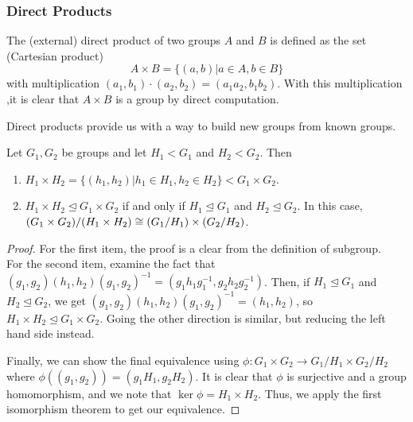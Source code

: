 \documentclass[11pt,leqno,oneside]{amsart}
\newcommand{\subgroup}{\mathrel{<}}
\newcommand{\normsubgroup}{\mathrel{\unlhd}}
\begin{document}
\subsubsection*{Direct Products}

\begin{defn}
    The (external) direct product of two groups $A$ and $B$ is defined as the set (Cartesian product) \[
        A \times B = \{(a,b) | a \in A, b \in B \}
    \] with multiplication $(a_1,b_1) \cdot (a_2,b_2) = (a_1a_2,b_1b_2)$. With this multiplication ,it is clear that $A \times B$ is a group by direct computation.
\end{defn}

Direct products provide us with a way to build new groups from known groups.

\begin{lem}
    Let $G_1, G_2$ be groups and let $H_1 \subgroup G_1$ and $H_2 \subgroup G_2$. Then
    \begin{enumerate}[label=(\alph*)]
        \item $H_1 \times H_2 = \{(h_1,h_2) | h_1 \in H_1, h_2 \in H_2\} \subgroup G_1 \times G_2$.
        \item $H_1 \times H_2 \normsubgroup G_1 \times G_2$ if and only if $H_1 \normsubgroup G_1$ and $H_2 \normsubgroup G_2$. In this case, $(G_1 \times G_2)/(H_1 \times H_2) \mathrel{\cong} (G_1/H_1) \times (G_2/H_2)$.
    \end{enumerate}
\end{lem}
\begin{proof}
    For the first item, the proof is a clear from the definition of subgroup. \\

    For the second item, examine the fact that
    $(g_1,g_2)(h_1,h_2)(g_1,g_2)^{-1} = (g_1h_1g_1^{-1},g_2h_2g_2^{-1})$. Then,
    if $H_1 \normsubgroup G_1$ and $H_2 \normsubgroup G_2$, we get
    $(g_1,g_2)(h_1,h_2)(g_1,g_2)^{-1} = (h_1,h_2)$, so $H_1 \times H_2
    \normsubgroup G_1 \times G_2$. Going the other direction is similar, but
    reducing the left hand side instead.

    Finally, we can show the final equivalence using $\phi: G_1 \times G_2 \to
    G_1/H_1 \times G_2/H_2$ where $\phi( (g_1,g_2) ) = (g_1H_1, g_2H_2)$. It
    is clear that $\phi$ is surjective and a group homomorphism, and we note
    that $\ker \phi = H_1 \times H_2$. Thus, we apply the first isomorphism
    theorem to get our equivalence.
\end{proof}
\end{document}
